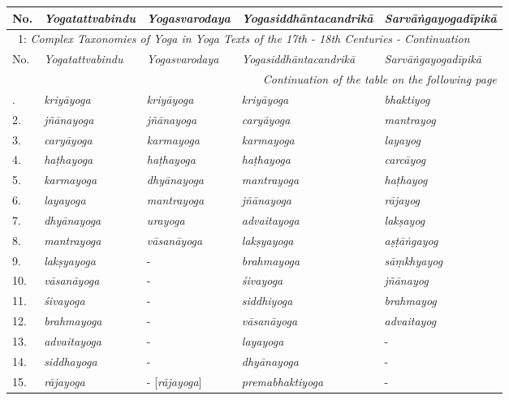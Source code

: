 {\RaggedRight
\label{15yogastable}
\begingroup
{}
\endgroup
\setlength{\extrarowheight}{.5em}
\begin{tabularx}{\textwidth}{p{}|p{}|p{}|p{}|p{}}  
  No. & \textit{Yogatattvabindu} & \textit{Yogasvarodaya} & \textit{Yogasiddhāntacandrikā} & \textit{Sarvāṅgayogadīpikā} \\
  \endfirsthead
    \multicolumn{5}{l}{\tablename\ 1: \textit{Complex Taxonomies of Yoga in Yoga Texts of the 17th - 18th Centuries - Continuation \medskip \medskip}} \\
\hline
 No. & \textit{Yogatattvabindu} & \textit{Yogasvarodaya} & \textit{Yogasiddhāntacandrikā} & \textit{Sarvāṅgayogadīpikā} \\
\hline
\endhead
\hline \multicolumn{5}{r}{\textit{Continuation of the table on the following page}} \\
\endfoot
\hline
\endlastfoot
  
\hline
1. & \textit{kriyāyoga} & \textit{kriyāyoga} & \textit{kriyāyoga} & \textit{bhaktiyog} \\
\hline
2. & \textit{jñānayoga} & \textit{jñānayoga} & \textit{caryāyoga} & \textit{mantrayog} \\
\hline
3. & \textit{caryāyoga} & \textit{karmayoga} & \textit{karmayoga} & \textit{layayog} \\
\hline
4. & \textit{haṭhayoga} & \textit{haṭhayoga} & \textit{haṭhayoga} & \textit{carcāyog} \\
\hline
5. & \textit{karmayoga} & \textit{dhyānayoga} & \textit{mantrayoga} & \textit{haṭhayog} \\
\hline
6. & \textit{layayoga}  & \textit{mantrayoga} & \textit{jñānayoga} & \textit{rājayog} \\
\hline
7. & \textit{dhyānayoga} & \textit{urayoga}   & \textit{advaitayoga} & \textit{lakṣayog} \\
\hline
8. & \textit{mantrayoga} & \textit{vāsanāyoga} & \textit{lakṣyayoga} & \textit{aṣṭāṅgayog} \\
\hline
9. & \textit{lakṣyayoga} & -                   & \textit{brahmayoga} & \textit{sāṃkhyayog} \\
\hline
10.& \textit{vāsanāyoga} & -                   & \textit{śivayoga} & \textit{jñānayog} \\
\hline
11. & \textit{śivayoga} & -                    & \textit{siddhiyoga} & \textit{brahmayog} \\
\hline
12. & \textit{brahmayoga} & -                  & \textit{vāsanāyoga} & \textit{advaitayog} \\
\hline
13. & \textit{advaitayoga} & -                 & \textit{layayoga} & - \\
\hline
14. & \textit{siddhayoga} & -                  & \textit{dhyānayoga} & - \\
\hline
15. & \textit{rājayoga} & - [\textit{rājayoga}]& \textit{premabhaktiyoga} & - \\
\end{tabularx}

}
